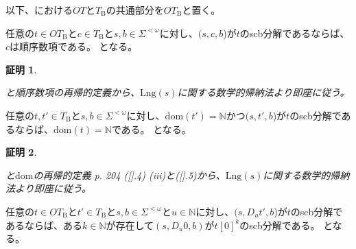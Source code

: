 \documentclass[dvipdfmx,uplatex]{jsarticle}
\theoremstyle{customnonumberbreakfortheorem}
\theoremstyle{customnonumberbreakforproof}
\newtheorem{hideableproof}{証明}
\begin{document}
以下、\cite{buc1}における\(OT\)と\(T_{\textrm{B}}\)の共通部分を\(OT_{\textrm{B}}\)と置く。

\begin{lemma}[順序数項の再帰構造]\label{順序数項の再帰構造}
	任意の\(t \in OT_{\textrm{B}}\)と\(c \in T_{\textrm{B}}\)と\(s,b \in \Sigma^{< \omega}\)に対し、\((s,c,b\))が\(t\)のscb分解であるならば、\(c\)は順序数項である。
	となる。
\end{lemma}

\begin{hideableproof}
	\begin{indented}
		\item {}と順序数項の再帰的定義から、\(\textrm{Lng}(s)\)に関する数学的帰納法より即座に従う。
	\end{indented}
\end{hideableproof}

\begin{lemma}[順序数項の共終数の遺伝性]\label{順序数項の共終数の遺伝性}
	任意の\(t,t' \in T_{\textrm{B}}\)と\(s,b \in \Sigma^{< \omega}\)に対し、\(\textrm{dom}(t') = \mathbb{N}\)かつ\((s,t',b\))が\(t\)のscb分解であるならば、\(\textrm{dom}(t) = \mathbb{N}\)である。
	となる。
\end{lemma}

\begin{hideableproof}
	\begin{indented}
		\item {}と\(\textrm{dom}\)の再帰的定義\cite{buc1} p. 204 ([].4) (iii)と([].5)から、\(\textrm{Lng}(s)\)に関する数学的帰納法より即座に従う。
	\end{indented}
\end{hideableproof}

\begin{lemma}[順序数項の末尾項の零化可能性]\label{順序数項の末尾項の零化可能性}
	任意の\(t \in OT_{\textrm{B}}\)と\(t' \in T_{\textrm{B}}\)と\(s,b \in \Sigma^{< \omega}\)と\(u \in \mathbb{N}\)に対し、\((s,D_u t',b\))が\(t\)のscb分解であるならば、ある\(k \in \mathbb{N}\)が存在して\((s,D_u 0,b)\)が\(t[0]^k\)のscb分解である。
	となる。
\end{lemma}
\end{document}
